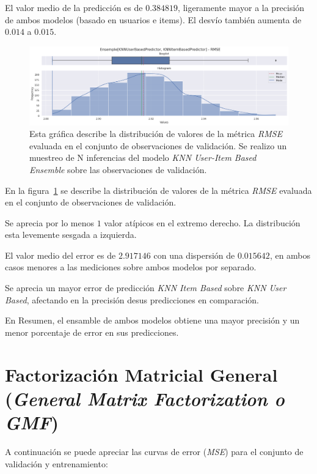 \documentclass[11pt,a4paper,twoside]{thesis}
\begin{document}
El valor medio de la predicción es de $0.384819$, ligeramente mayor a la
precisión de ambos modelos (basado en usuarios e items). El desvío también
aumenta de $0.014$ a $0.015$.

\begin{figure}[!htb]
	\centering
	\includegraphics[width=15cm]{./images/metrics-knn-ensemple-RMSE.png}
	\caption{
		Esta gráfica describe la distribución de valores de la métrica
		\textit{RMSE} evaluada en el conjunto de observaciones de
		validación. Se realizo un muestreo de N inferencias del modelo
		\textit{KNN User-Item Based Ensemble} sobre las observaciones
		de validación.
	}
	\label{fig:knnEnsempleRMSE}
\end{figure}

En la figura~\ref{fig:knnEnsempleRMSE} se describe la distribución de valores
de la métrica \textit{RMSE} evaluada en el conjunto de observaciones de
validación.

Se aprecia por lo menos $1$ valor atípicos en el extremo derecho. La
distribución esta levemente sesgada a izquierda.

El valor medio del error es de $2.917146$ con una dispersión de $0.015642$, en
ambos casos menores a las mediciones sobre ambos modelos por separado.

Se aprecia un mayor error de predicción \textit{KNN Item Based} sobre
\textit{KNN User Based}, afectando en la precisión desus predicciones en
comparación.

En Resumen, el ensamble de ambos modelos obtiene una mayor precisión y un menor
porcentaje de error en sus predicciones.

\clearpage
\section{Factorización Matricial General (\textit{General Matrix Factorization o GMF})}

A continuación se puede apreciar las curvas de error (\textit{MSE}) para el
conjunto de validación y entrenamiento:
\end{document}
